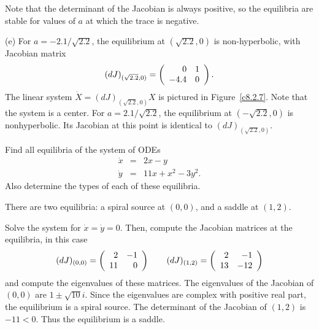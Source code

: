 \documentclass{ximera}
\begin{document}
\begin{exercise}
\begin{solution}
\soln Note that the determinant of the Jacobian is always positive, so
the equilibria are stable for values of $a$ at which the trace is negative.

(e) For $a = -2.1/\sqrt{2.2}$, the equilibrium at $(\sqrt{2.2},0)$
is non-hyperbolic, with Jacobian matrix
\[
(dJ)_{(\sqrt{2.2},0)} = \left(\begin{array}{rr} 0 & 1\\ -4.4 &0\end{array}\right).
\]
The linear system $\dot{X} = (dJ)_{(\sqrt{2.2},0)}X$ is pictured in
Figure~\ref{c8.2.7}.  Note that the system is a center.  For
$a = 2.1/\sqrt{2.2}$, the equilibrium at $(-\sqrt{2.2},0)$ is
nonhyperbolic.  Its Jacobian at this point is identical to
$(dJ)_{(\sqrt{2.2},0)}$.

\begin{figure}[htb]
                       \centerline{%
                       }
\end{figure}

\end{solution}
\end{exercise}

\begin{exercise} \label{c8.2.8}
Find all equilibria of the system of ODEs
\begin{eqnarray*}
\dot{x} & = & 2x - y \\
\dot{y} & = & 11x + x^2 - 3y^2.
\end{eqnarray*}
Also determine the types of each of these equilibria.

\begin{solution}

\ans There are two equilibria: a spiral source at $(0,0)$, and a saddle
at $(1,2)$.

\soln Solve the system for $\dot{x} = \dot{y} = 0$.  Then, compute the
Jacobian matrices at the equilibria, in this case
\[
(dJ)_{(0,0)} = \left(\begin{array}{rr} 2 & -1\\ 11 &0\end{array}\right) \qquad
(dJ)_{(1,2)} = \left(\begin{array}{rr} 2 & -1\\ 13 &-12\end{array}\right)
\]
and compute the eigenvalues of these matrices.  The eigenvalues of the
Jacobian of $(0,0)$ are $1 \pm \sqrt{10}i$.  Since the eigenvalues
are complex with positive real part, the equilibrium is
a spiral source.  The determinant of the Jacobian of $(1,2)$ is
$-11 < 0$.  Thus the equilibrium is a saddle.

\end{solution}
\end{exercise}
\end{document}
